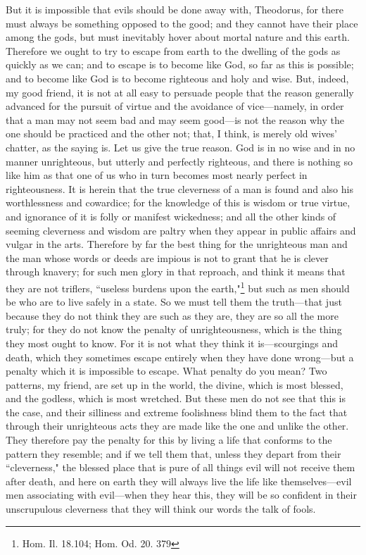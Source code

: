 \documentclass[letterpaper,12pt]{article}
\newcommand{\stephpag}[1]{\marginnote{\small\itshape\fontfamily{ppl}\selectfont #1}}
\begin{document}
\begin{drama}
But it is impossible that evils should be done away with, Theodorus, for there must always be something opposed to the good; and they cannot have their place among the gods, but must inevitably hover about mortal nature and this earth. Therefore we ought to try to escape from earth to the dwelling of the gods as quickly as we can; \stephpag{b} and to escape is to become like God, so far as this is possible; and to become like God is to become righteous and holy and wise. But, indeed, my good friend, it is not at all easy to persuade people that the reason generally advanced for the pursuit of virtue and the avoidance of vice—namely, in order that a man may not seem bad and may seem good—is not the reason why the one should be practiced and the other not; that, I think, is merely old wives' chatter, as the saying is. \stephpag{c} Let us give the true reason. God is in no wise and in no manner unrighteous, but utterly and perfectly righteous, and there is nothing so like him as that one of us who in turn becomes most nearly perfect in righteousness. It is herein that the true cleverness of a man is found and also his worthlessness and cowardice; for the knowledge of this is wisdom or true virtue, and ignorance of it is folly or manifest wickedness; and all the other kinds of seeming cleverness and wisdom are paltry when they appear in public affairs and vulgar in the arts. Therefore by far the best thing for the unrighteous man \stephpag{d} and the man whose words or deeds are impious is not to grant that he is clever through knavery; for such men glory in that reproach, and think it means that they are not triflers, ``useless burdens upon the earth,"\footnote{Hom. Il. 18.104; Hom. Od. 20. 379} but such as men should be who are to live safely in a state. So we must tell them the truth—that just because they do not think they are such as they are, they are so all the more truly; for they do not know the penalty of unrighteousness, which is the thing they most ought to know. For it is not what they think it is—scourgings and death, which they sometimes escape entirely when they have done wrong—but a penalty which it is impossible \stephpag{e} to escape.
\theodorusspeaks
What penalty do you mean?
\socratesspeaks
Two patterns, my friend, are set up in the world, the divine, which is most blessed, and the godless, which is most wretched. But these men do not see that this is the case, and their silliness and extreme foolishness blind them to the fact that \stephpag{177 a} through their unrighteous acts they are made like the one and unlike the other. They therefore pay the penalty for this by living a life that conforms to the pattern they resemble; and if we tell them that, unless they depart from their ``cleverness," the blessed place that is pure of all things evil will not receive them after death, and here on earth they will always live the life like themselves—evil men associating with evil—when they hear this, they will be so confident in their unscrupulous cleverness that they will think our words the talk of fools.

\end{drama}
\end{document}
